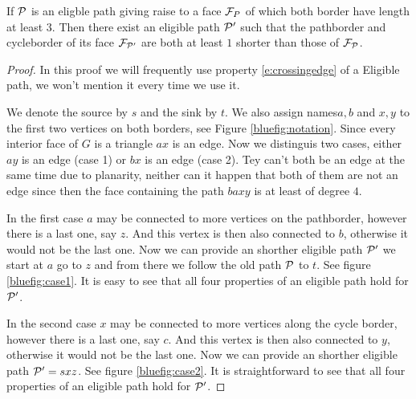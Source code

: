 \begin{lemma}
\label{lem:bluealgo}
If $\P$ is an eligble path giving raise to a face $\F_P$ of which both border have length at least $3$. Then there exist an eligible path $\P'$ such that the pathborder and cycleborder of its face $\F_{\P'}$ are both at least $1$ shorter than those of $\F_\P$.
\end{lemma}

\begin{proof}
In this proof we will frequently use property \ref{e:crossingedge} of a Eligible path, we won't mention it every time we use it.

We denote the source by $s$ and the sink by $t$. We also assign names$a, b$ and $x, y$ to the first two vertices on both borders, see Figure \ref{bluefig:notation}. Since every interior face of $G$ is a triangle $ax$ is an edge. Now we distinguis two cases, either $ay$ is an edge (case 1) or $bx$ is an edge (case 2). Tey can't both be an edge at the same time due to planarity, neither can it happen that both of them are not an edge since then the face containing the path $baxy$ is at least of degree $4$.

In the first case $a$ may be connected to more vertices on the pathborder, however there is a last one, say $z$. And this vertex is then also connected to $b$, otherwise it would not be the last one. Now we can provide an shorther eligible path $\P'$ we start at $a$ go to $z$ and from there we follow the old path $\P$ to $t$.  See figure \ref{bluefig:case1}. It is easy to see that all four properties of an eligible path hold for $\P'$.

In the second case $x$ may be connected to more vertices along the cycle border, however there is a last one, say $c$. And this vertex is then also connected to $y$, otherwise it would not be the last one. Now we can provide an shorther eligible path $\P' = sxz$.   See figure \ref{bluefig:case2}. It is straightforward to see that all four properties of an eligible path hold for $\P'$. %
\end{proof}

